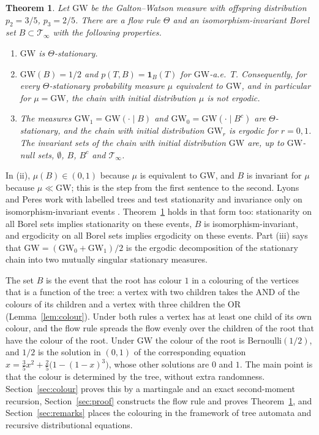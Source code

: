 \documentclass[11pt]{amsart}
\newtheorem{theorem}{Theorem}
\theoremstyle{remark}
\numberwithin{equation}{section}
\newcommand{\T}{\mathcal T}
\newcommand{\GW}{\mathrm{GW}}
\newcommand{\one}{\mathbf 1}
\begin{document}
\begin{theorem}\label{thm:main}
Let $\GW$ be the Galton--Watson measure with offspring distribution $p_2=3/5$, $p_3=2/5$. There are a flow rule $\Theta$ and an isomorphism-invariant Borel set $B\subset\T_\infty$ with the following properties.
\begin{enumerate}[label=\textup{(\roman*)}]
\item $\GW$ is $\Theta$-stationary.
\item $\GW(B)=1/2$ and $p(T,B)=\one_B(T)$ for $\GW$-a.e.\ $T$. Consequently, for every $\Theta$-stationary probability measure $\mu$ equivalent to $\GW$, and in particular for $\mu=\GW$, the chain with initial distribution $\mu$ is not ergodic.
\item The measures $\GW_1=\GW(\cdot\mid B)$ and $\GW_0=\GW(\cdot\mid B^c)$ are $\Theta$-stationary, and the chain with initial distribution $\GW_r$ is ergodic for $r=0,1$. The invariant sets of the chain with initial distribution $\GW$ are, up to $\GW$-null sets, $\emptyset$, $B$, $B^c$ and $\T_\infty$.
\end{enumerate}
\end{theorem}

In (ii), $\mu(B)\in(0,1)$ because $\mu$ is equivalent to $\GW$, and $B$ is invariant for $\mu$ because $\mu\ll\GW$; this is the step from the first sentence to the second. Lyons and Peres work with labelled trees and test stationarity and invariance only on isomorphism-invariant events \cite[Chapter~17]{LP}. Theorem~\ref{thm:main} holds in that form too: stationarity on all Borel sets implies stationarity on these events, $B$ is isomorphism-invariant, and ergodicity on all Borel sets implies ergodicity on these events. Part (iii) says that $\GW=(\GW_0+\GW_1)/2$ is the ergodic decomposition of the stationary chain into two mutually singular stationary measures.

The set $B$ is the event that the root has colour $1$ in a colouring of the vertices that is a function of the tree: a vertex with two children takes the AND of the colours of its children and a vertex with three children the OR (Lemma~\ref{lem:colour}). Under both rules a vertex has at least one child of its own colour, and the flow rule spreads the flow evenly over the children of the root that have the colour of the root. Under $\GW$ the colour of the root is Bernoulli$(1/2)$, and $1/2$ is the solution in $(0,1)$ of the corresponding equation $x=\frac35x^2+\frac25\bigl(1-(1-x)^3\bigr)$, whose other solutions are $0$ and $1$. The main point is that the colour is determined by the tree, without extra randomness. Section~\ref{sec:colour} proves this by a martingale and an exact second-moment recursion, Section~\ref{sec:proof} constructs the flow rule and proves Theorem~\ref{thm:main}, and Section~\ref{sec:remarks} places the colouring in the framework of tree automata and recursive distributional equations.
\end{document}
